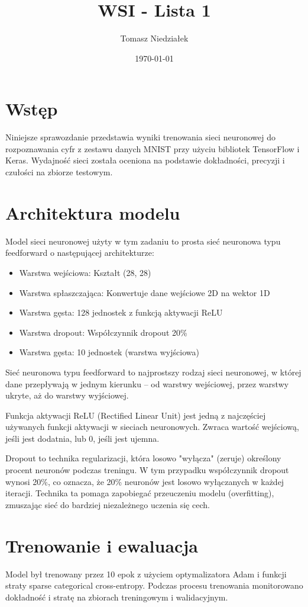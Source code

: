 \documentclass{article}
\title{WSI - Lista 1}
\author{Tomasz Niedziałek}
\date{\today}
\begin{document}
\maketitle

\section{Wstęp} \label{sec:introduction}
Niniejsze sprawozdanie przedstawia wyniki trenowania sieci neuronowej do rozpoznawania cyfr z zestawu danych MNIST przy użyciu bibliotek TensorFlow i Keras. Wydajność sieci została oceniona na podstawie dokładności, precyzji i czułości na zbiorze testowym.

\section{Architektura modelu} \label{sec:model_architecture}
Model sieci neuronowej użyty w tym zadaniu to prosta sieć neuronowa typu feedforward o następującej architekturze:
\begin{itemize}
    \item Warstwa wejściowa: Kształt (28, 28)
    \item Warstwa spłaszczająca: Konwertuje dane wejściowe 2D na wektor 1D
    \item Warstwa gęsta: 128 jednostek z funkcją aktywacji ReLU
    \item Warstwa dropout: Współczynnik dropout 20\%
    \item Warstwa gęsta: 10 jednostek (warstwa wyjściowa)
\end{itemize}
Sieć neuronowa typu feedforward to najprostszy rodzaj sieci neuronowej, w której dane przepływają w jednym kierunku – od warstwy wejściowej, przez warstwy ukryte, aż do warstwy wyjściowej.

Funkcja aktywacji ReLU (Rectified Linear Unit) jest jedną z najczęściej używanych funkcji aktywacji w sieciach neuronowych. Zwraca wartość wejściową, jeśli jest dodatnia, lub 0, jeśli jest ujemna.

Dropout to technika regularizacji, która losowo "wyłącza" (zeruje) określony procent neuronów podczas treningu. W tym przypadku współczynnik dropout wynosi 20\%, co oznacza, że 20\% neuronów jest losowo wyłączanych w każdej iteracji. Technika ta pomaga zapobiegać przeuczeniu modelu (overfitting), zmuszając sieć do bardziej niezależnego uczenia się cech.

\section{Trenowanie i ewaluacja} \label{sec:training_evaluation}
Model był trenowany przez 10 epok z użyciem optymalizatora Adam i funkcji straty sparse categorical cross-entropy. Podczas procesu trenowania monitorowano dokładność i stratę na zbiorach treningowym i walidacyjnym.
\end{document}
